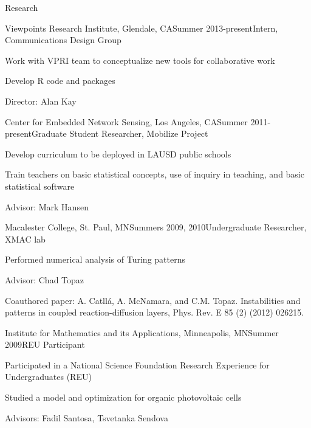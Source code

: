 \documentclass{resume} %
\begin{document}
\begin{rSection}{Research}

\begin{rSubsection}{Viewpoints Research Institute, }{Glendale, CA}{Summer 2013-present}{Intern, Communications Design Group}
\item Work with VPRI team to conceptualize new tools for collaborative work
\item Develop R code and packages
\item Director: Alan Kay
\end{rSubsection}


\begin{rSubsection}{Center for Embedded Network Sensing, }{Los Angeles, CA}{Summer 2011-present}{Graduate Student Researcher, Mobilize Project}
\item Develop curriculum to be deployed in LAUSD public schools
\item Train teachers on basic statistical concepts, use of inquiry in teaching, and basic statistical software
\item Advisor: Mark Hansen
\end{rSubsection}


\begin{rSubsection}{Macalester College, }{St. Paul, MN}{Summers 2009, 2010}{Undergraduate Researcher, XMAC lab}
\item Performed numerical analysis of Turing patterns
\item Advisor: Chad Topaz
\item Coauthored paper: A. Catll{\'a}, A. McNamara, and C.M. Topaz. Instabilities and patterns in coupled reaction-diffusion layers, Phys. Rev. E 85 (2) (2012) 026215.
\end{rSubsection}


\begin{rSubsection}{Institute for Mathematics and its Applications, }{Minneapolis, MN}{Summer 2009}{REU Participant}
\item Participated in a National Science Foundation Research Experience for Undergraduates (REU)
\item Studied a model and optimization for organic photovoltaic cells
\item Advisors: Fadil Santosa, Tsvetanka Sendova
\end{rSubsection}

\end{rSection}
\end{document}
